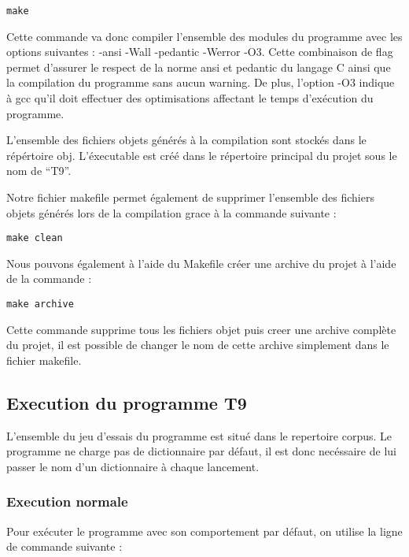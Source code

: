 \documentclass[15pt, a4paper]{article}
\begin{document}
\begin{verbatim}
make
\end{verbatim}

Cette commande va donc compiler l'ensemble des modules du programme avec les options suivantes :  
-ansi -Wall -pedantic -Werror -O3. Cette combinaison de flag permet d'assurer le respect de la norme ansi et
pedantic du langage C ainsi que la compilation du programme sans aucun warning. De plus, l'option -O3 indique
à gcc qu'il doit effectuer des optimisations affectant le temps d'exécution du programme.

L'ensemble des fichiers objets générés à la compilation sont stockés dans le répértoire obj. L'éxecutable est créé 
dans le répertoire principal du projet sous le nom de ``T9''.

\bigskip

Notre fichier makefile permet également de supprimer l'ensemble des fichiers objets générés lors de la
compilation grace à la commande suivante :

\begin{verbatim}
make clean
\end{verbatim}

\noindent Nous pouvons également à l'aide du Makefile créer une archive du projet à l'aide de la commande :

\begin{verbatim}
make archive
\end{verbatim}

Cette commande supprime tous les fichiers objet puis creer une archive complète du projet, il est possible
de changer le nom de cette archive simplement dans le fichier makefile.

\subsection{Execution du programme T9}

L'ensemble du jeu d'essais du programme est situé dans le repertoire corpus. Le programme ne charge pas 
de dictionnaire par défaut, il est donc necéssaire de lui passer le nom d'un dictionnaire à chaque lancement.

\subsubsection{Execution normale}

Pour exécuter le programme avec son comportement par défaut, on utilise la ligne de commande suivante : 
\end{document}
